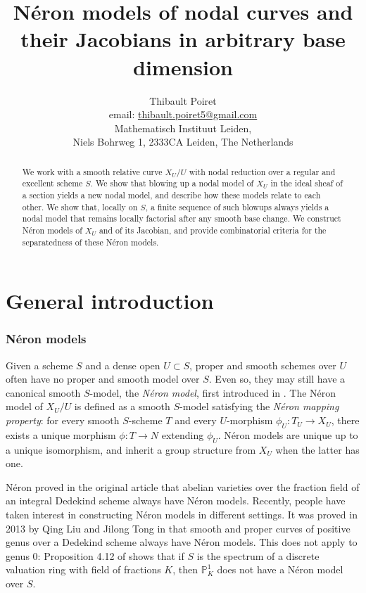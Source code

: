 \documentclass[a4paper,10pt,twoside]{article}
\title{Néron models of nodal curves and their Jacobians in arbitrary base dimension}
\author{Thibault Poiret \\ email: \href{mailto:thibault.poiret5@gmail.com}{thibault.poiret5@gmail.com} \\
Mathematisch Instituut Leiden, \\
Niels Bohrweg 1, 2333CA Leiden, The Netherlands}
\newcommand{\ra}{\rightarrow}
\theoremstyle{definition}
\theoremstyle{remark}
\begin{document}
\maketitle

\begin{abstract} 
We work with a smooth relative curve $X_U/U$ with nodal reduction over a regular and excellent scheme $S$. We show that blowing up a nodal model of $X_U$ in the ideal sheaf of a section yields a new nodal model, and describe how these models relate to each other. We show that, locally on $S$, a finite sequence of such blowups always yields a nodal model that remains locally factorial after any smooth base change. We construct Néron models of $X_U$ and of its Jacobian, and provide combinatorial criteria for the separatedness of these Néron models.
\end{abstract}


\tableofcontents


\part*{General introduction}


\section*{N\'eron models}
Given a scheme $S$ and a dense open $U\subset S$, proper and smooth schemes over $U$ often have no proper and smooth model over $S$. Even so, they may still have a canonical smooth $S$-model, the \emph{N\'eron model}, first introduced in \cite{neron_article}. The N\'eron model of $X_U/U$ is defined as a smooth $S$-model satisfying the \emph{Néron mapping property}: for every smooth $S$-scheme $T$ and every $U$-morphism $\phi_U\colon T_U\rightarrow X_U$, there exists a unique morphism $\phi\colon T\ra N$ extending $\phi_U$. Néron models are unique up to a unique isomorphism, and inherit a group structure from $X_U$ when the latter has one.

Néron proved in the original article \cite{neron_article} that abelian varieties over the fraction field of an integral Dedekind scheme always have N\'eron models. Recently, people have taken interest in constructing N\'eron models in different settings. It was proved in 2013 by Qing Liu and Jilong Tong in \cite{LiuTong} that smooth and proper curves of positive genus over a Dedekind scheme always have N\'eron models. This does not apply to genus $0$: Proposition 4.12 of \cite{LiuTong} shows that if $S$ is the spectrum of a discrete valuation ring with field of fractions $K$, then $\mathbb P^1_K$ does not have a N\'eron model over $S$.
\end{document}
